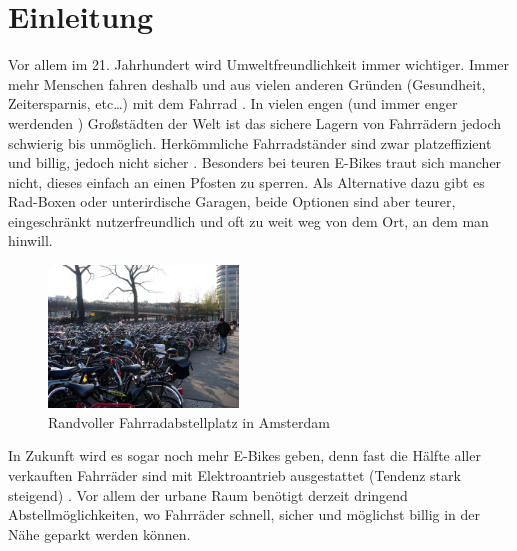 \section{Einleitung}
Vor allem im 21. Jahrhundert wird Umweltfreundlichkeit immer wichtiger. Immer mehr Menschen fahren deshalb und aus vielen anderen Gründen (Gesundheit, Zeitersparnis, etc…) mit dem Fahrrad . In vielen engen (und immer enger werdenden ) Großstädten der Welt ist das sichere Lagern von Fahrrädern jedoch schwierig bis unmöglich. Herkömmliche Fahrradständer sind zwar platzeffizient und billig, jedoch nicht sicher . Besonders bei teuren E-Bikes traut sich mancher nicht, dieses einfach an einen Pfosten zu sperren. Als Alternative dazu gibt es Rad-Boxen oder unterirdische Garagen, beide Optionen sind aber teurer, eingeschränkt nutzerfreundlich und oft zu weit weg von dem Ort, an dem man hinwill.

\begin{figure}[H]
    \centering
    \includegraphics[width=0.45\textwidth]{images/fahrrad_parkhaus_voll}
    \caption{Randvoller Fahrradabstellplatz in Amsterdam }
    \label{fig:fahrrad_parkhaus_voll}
\end{figure}

In Zukunft wird es sogar noch mehr E-Bikes geben, denn fast die Hälfte aller verkauften Fahrräder sind mit Elektroantrieb ausgestattet (Tendenz stark steigend) . Vor allem der urbane Raum benötigt derzeit dringend Abstellmöglichkeiten, wo Fahrräder schnell, sicher und möglichst billig in der Nähe geparkt werden können.

\clearpage


\clearpage



